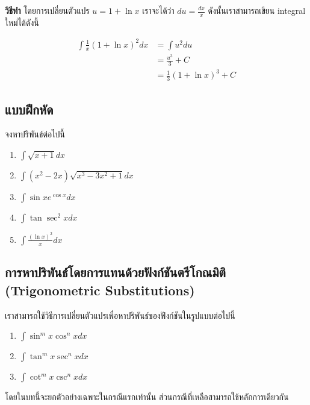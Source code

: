 \documentclass[
]{book}
\theoremstyle{definition}
\theoremstyle{definition}
\theoremstyle{definition}
\theoremstyle{definition}
\theoremstyle{remark}
\begin{document}
\textbf{วิธีทำ} โดยการเปลี่ยนตัวแปร \(u = 1 + \ln x\) เราจะได้ว่า \(du =  \frac{dx}{x}\)
ดังนั้นเราสามารถเขียน integral ใหม่ได้ดังนี้  

\[\begin{aligned}
        \int \frac{1}{x} (1+ \ln x)^2 dx  &= \int u^2 du \\
                                &= \frac{u^3}{3} + C\\
                                &= \frac{1}{3} (1 + \ln x)^3 + C
\end{aligned}\]

 

\subsection{แบบฝึกหัด}\label{uxe41uxe1auxe1auxe1duxe01uxe2buxe14}

จงหาปริพันธ์ต่อไปนี้

\begin{enumerate}
\def\labelenumi{\arabic{enumi}.}
\item
  \(\int \sqrt{x+1} dx\)
\item
  \(\int (x^2 - 2x) \sqrt{x^3 - 3x^2 +1} dx\)
\item
  \(\int \sin x e^{\cos x} dx\)
\item
  \(\int \tan \sec^2 x dx\)
\item
  \(\int \frac{(\ln x)^2}{x} dx\)
\end{enumerate}

\subsection{การหาปริพันธ์โดยการแทนด้วยฟังก์ชันตรีโกณมิติ (Trigonometric Substitutions)}\label{uxe01uxe32uxe23uxe2buxe32uxe1buxe23uxe1euxe19uxe18uxe42uxe14uxe22uxe01uxe32uxe23uxe41uxe17uxe19uxe14uxe27uxe22uxe1fuxe07uxe01uxe0auxe19uxe15uxe23uxe42uxe01uxe13uxe21uxe15-trigonometric-substitutions}

เราสามารถใช้วิธีการเปลี่ยนตัวแปรเพื่อหาปริพันธ์ของฟังก์ชันในรูปแบบต่อไปนี้

\begin{enumerate}
\def\labelenumi{\arabic{enumi}.}
\item
  \(\int \sin^m x \cos^n x dx\)
\item
  \(\int \tan^m x \sec^n x dx\)
\item
  \(\int \cot^m x \csc^n x dx\)
\end{enumerate}

โดยในบทนี้จะยกตัวอย่างเฉพาะในกรณีแรกเท่านั้น ส่วนกรณีที่เหลือสามารถใช้หลักการเดียวกัน
\end{document}
